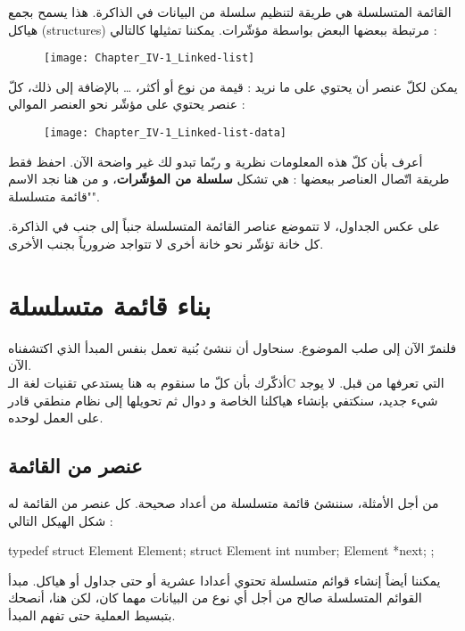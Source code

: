 القائمة المتسلسلة هي طريقة لتنظيم سلسلة من البيانات في الذاكرة. هذا يسمح بجمع هياكل
(\textenglish{structures})
مرتبطة ببعضها البعض بواسطة مؤشّرات. يمكننا تمثيلها كالتالي :

\begin{figure}[H]
	\centering
	\texttt{[image: Chapter\_IV-1\_Linked-list]}
\end{figure}

يمكن لكلّ عنصر أن يحتوي على ما نريد : قيمة من نوع 
أو أكثر،
 \dots
بالإضافة إلى ذلك، كلّ عنصر يحتوي على مؤشّر نحو العنصر الموالي :

\begin{figure}[H]
	\centering
	\texttt{[image: Chapter\_IV-1\_Linked-list-data]}
\end{figure}

أعرف بأن كلّ هذه المعلومات نظرية و ربّما تبدو لك غير واضحة الآن. احفظ فقط طريقة اتّصال العناصر ببعضها : هي تشكل 
\textbf{سلسلة من المؤشّرات}،
و من هنا نجد الاسم "قائمة متسلسلة". 

\begin{information}
على عكس الجداول، لا تتموضع عناصر القائمة المتسلسلة جنباً إلى جنب في الذاكرة. كل خانة تؤشّر نحو خانة أخرى لا تتواجد ضرورياً بجنب الأخرى.
\end{information}

\section{بناء قائمة متسلسلة}

فلنمرّ الآن إلى صلب الموضوع. سنحاول أن ننشئ بُنية تعمل بنفس المبدأ الذي اكتشفناه الآن.\\
أذكّرك بأن كلّ ما سنقوم به هنا يستدعي تقنيات لغة الـ\textenglish{C}
 التي تعرفها من قبل. لا يوجد شيء جديد، سنكتفي بإنشاء هياكلنا الخاصة و دوال ثم تحويلها إلى نظام منطقي قادر على العمل لوحده.

\subsection{عنصر من القائمة}

من أجل الأمثلة، سننشئ قائمة متسلسلة من أعداد صحيحة. كل عنصر من القائمة له شكل الهيكل التالي :

\begin{Csource}
typedef struct Element Element;
struct Element
{
	int number;
	Element *next;
};
\end{Csource}

\begin{information}
يمكننا أيضاً إنشاء قوائم متسلسلة تحتوي أعدادا عشرية أو حتى جداول أو هياكل. مبدأ القوائم المتسلسلة صالح من أجل أي نوع من البيانات مهما كان، لكن هنا، أنصحك بتبسيط العملية حتى تفهم المبدأ.
\end{information}

